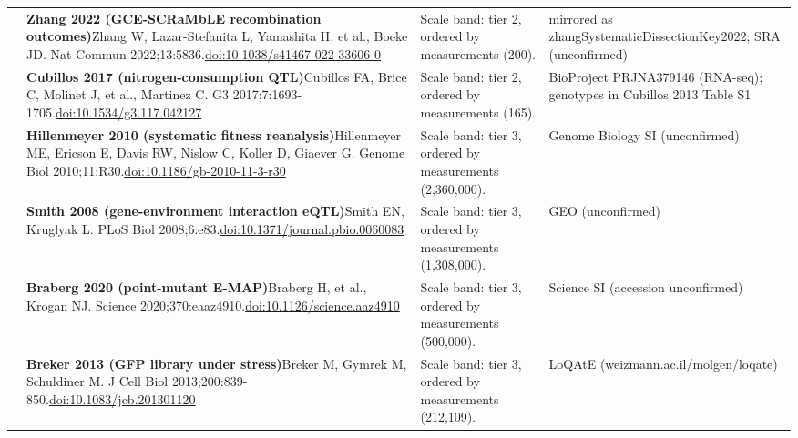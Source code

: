 \begin{landscape}
\begin{longtable}{@{}r@{\hspace{4pt}} L{86mm} L{92mm} L{62mm}@{}}
 & \textbf{Zhang 2022 (GCE-SCRaMbLE recombination outcomes)}\newline Zhang W, Lazar-Stefanita L, Yamashita H, et al., Boeke JD. Nat Commun 2022;13:5836.\newline \href{https://doi.org/10.1038/s41467-022-33606-0}{doi:10.1038/\allowbreak s41467-022-33606-0} & Scale band: tier 2, ordered by measurements (200). & mirrored as zhangSystematicDissectionKey2022; SRA (unconfirmed) \\
 & \textbf{Cubillos 2017 (nitrogen-consumption QTL)}\newline Cubillos FA, Brice C, Molinet J, et al., Martinez C. G3 2017;7:1693-1705.\newline \href{https://doi.org/10.1534/g3.117.042127}{doi:10.1534/\allowbreak g3.117.042127} & Scale band: tier 2, ordered by measurements (165). & BioProject PRJNA379146 (RNA-seq); genotypes in Cubillos 2013 Table S1 \\
 & \textbf{Hillenmeyer 2010 (systematic fitness reanalysis)}\newline Hillenmeyer ME, Ericson E, Davis RW, Nislow C, Koller D, Giaever G. Genome Biol 2010;11:R30.\newline \href{https://doi.org/10.1186/gb-2010-11-3-r30}{doi:10.1186/\allowbreak gb-2010-11-3-r30} & Scale band: tier 3, ordered by measurements (2,360,000). & Genome Biology SI (unconfirmed) \\
 & \textbf{Smith 2008 (gene-environment interaction eQTL)}\newline Smith EN, Kruglyak L. PLoS Biol 2008;6:e83.\newline \href{https://doi.org/10.1371/journal.pbio.0060083}{doi:10.1371/\allowbreak journal.pbio.0060083} & Scale band: tier 3, ordered by measurements (1,308,000). & GEO (unconfirmed) \\
 & \textbf{Braberg 2020 (point-mutant E-MAP)}\newline Braberg H, et al., Krogan NJ. Science 2020;370:eaaz4910.\newline \href{https://doi.org/10.1126/science.aaz4910}{doi:10.1126/\allowbreak science.aaz4910} & Scale band: tier 3, ordered by measurements (500,000). & Science SI (accession unconfirmed) \\
 & \textbf{Breker 2013 (GFP library under stress)}\newline Breker M, Gymrek M, Schuldiner M. J Cell Biol 2013;200:839-850.\newline \href{https://doi.org/10.1083/jcb.201301120}{doi:10.1083/\allowbreak jcb.201301120} & Scale band: tier 3, ordered by measurements (212,109). & LoQAtE (weizmann.ac.il/\allowbreak molgen/\allowbreak loqate) \\

\end{longtable}
\end{landscape}
